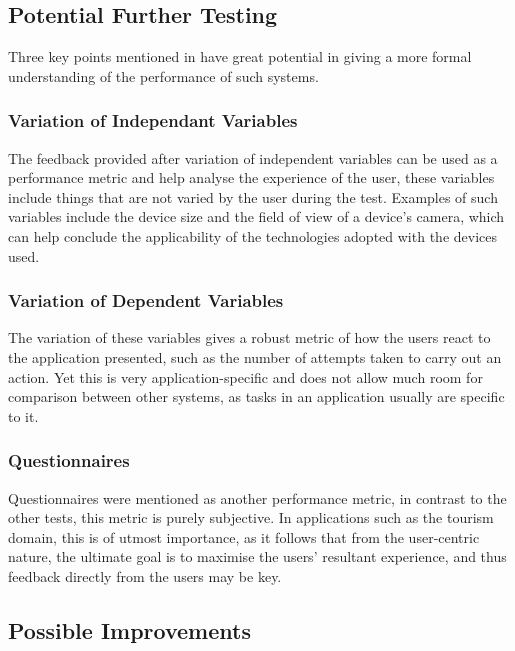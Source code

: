 \subsection{Potential Further Testing}
Three key points mentioned in \cite{Samini2017} have great potential in giving a more formal understanding of the performance of such systems. 
\subsubsection{Variation of Independant Variables}
The feedback provided after variation of independent variables can be used as a performance metric and help analyse the experience of the user, these variables include things that are not 
varied by the user during the test. Examples of such variables include the device size and the field of view of a device's 
camera, which can help conclude the applicability of the technologies adopted with the devices used.
\subsubsection{Variation of Dependent Variables}
The variation of these variables gives a robust metric of how the users react to the 
application presented, such as the number of attempts taken to carry out an action.
Yet this is very application-specific and does not allow much room for comparison between other systems, as 
tasks in an application usually are specific to it.

\subsubsection{Questionnaires}
Questionnaires were mentioned as another performance metric, in contrast to the other tests, this metric is purely subjective. 
In applications such as the tourism domain, this is of utmost importance, as it follows that 
from the user-centric nature, the ultimate goal is to maximise the users' resultant experience, and thus feedback directly from the users may be key.  

\subsection{Possible Improvements}
